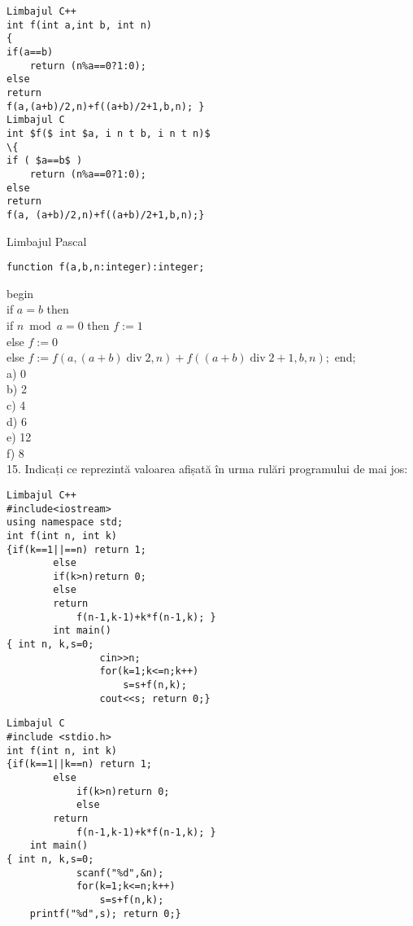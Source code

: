 \begin{verbatim}
Limbajul C++
int f(int a,int b, int n)
{
if(a==b)
    return (n%a==0?1:0);
else
return
f(a,(a+b)/2,n)+f((a+b)/2+1,b,n); }
Limbajul C
int $f($ int $a, i n t b, i n t n)$
\{
if ( $a==b$ )
    return (n%a==0?1:0);
else
return
f(a, (a+b)/2,n)+f((a+b)/2+1,b,n);}
\end{verbatim}

Limbajul Pascal

\begin{verbatim}
function f(a,b,n:integer):integer;
\end{verbatim}

begin\\
if $a=b$ then\\
if $n \bmod a=0$ then $f:=1$\\
else $f:=0$\\
else $f:=f(a,(a+b) \operatorname{div} 2, n)+f((a+b) \operatorname{div} 2+1, b, n) ;$ end;\\
a) 0\\
b) 2\\
c) 4\\
d) 6\\
e) 12\\
f) 8\\
15. Indicați ce reprezintă valoarea afișată în urma rulări programului de mai jos:

\begin{verbatim}
Limbajul C++
#include<iostream>
using namespace std;
int f(int n, int k)
{if(k==1||==n) return 1;
        else
        if(k>n)return 0;
        else
        return
            f(n-1,k-1)+k*f(n-1,k); }
        int main()
{ int n, k,s=0;
                cin>>n;
                for(k=1;k<=n;k++)
                    s=s+f(n,k);
                cout<<s; return 0;}
\end{verbatim}

\begin{verbatim}
Limbajul C
#include <stdio.h>
int f(int n, int k)
{if(k==1||k==n) return 1;
        else
            if(k>n)return 0;
            else
        return
            f(n-1,k-1)+k*f(n-1,k); }
    int main()
{ int n, k,s=0;
            scanf("%d",&n);
            for(k=1;k<=n;k++)
                s=s+f(n,k);
    printf("%d",s); return 0;}
\end{verbatim}

